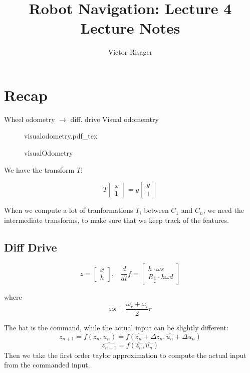\documentclass[a4paper]{article}
\title{Robot Navigation: Lecture 4 \\
	\large Lecture Notes}
\author{Victor Risager}
\newcommand{\incfig}[2][1]{%
    \def\svgwidth{#1\columnwidth}
    {#2.pdf_tex}
}
\begin{document}
\maketitle

\section{Recap}
Wheel odometry $ \rightarrow  $ diff. drive
Visual odomemtry

\begin{figure}[ht]
    \centering
    \incfig[1]{visualodometry}
    \caption{visualOdometry}
    \label{fig:visualodometry}
\end{figure}

We have the transform $ T $:

\[
T \begin{bmatrix}
x \\
1
\end{bmatrix} = y \begin{bmatrix}
y \\
1
\end{bmatrix} 
\] 

When we compute a lot of tranformations $ T_i $ between $ C_1 $ and $ C_n $, we need the intermediate transforms, to make sure that we keep track of the features.  

\subsection{Diff Drive}
\begin{equation}
z = \begin{bmatrix}
x \\
h
\end{bmatrix}, \hspace{10pt} \frac{d}{dt}f = \begin{bmatrix}
h \cdot \omega s  \\
R_{\frac{\pi}{2}} \cdot h \omega d 
\end{bmatrix} 
\end{equation}

where  
\[
\omega s = \frac{\omega_r + \omega_l}{2} r  
\] 



The hat is the command, while the actual input can be slightly different:
\begin{equation}
	z_{n+1} = f(z_n, u_n) = f( \hat{z_n} + \Delta z_n,  \hat{u_n} + \Delta u_n ) 
\end{equation}
\begin{equation}
	\hat{z_{n+1}} = f(\hat{z_n},\hat{u_n})
\end{equation}
Then we take the first order taylor approximation to compute the actual input from the commanded input. 
\end{document}
